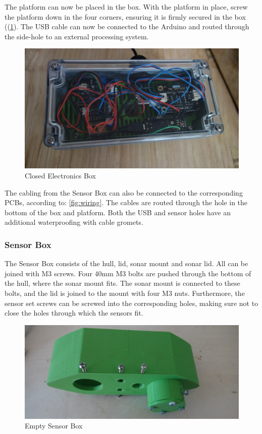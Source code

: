 \documentclass[
  english,
  man,floatsintext]{apa6}
\begin{document}
The platform can now be placed in the box. With the platform in place, screw the platform down in the four corners, ensuring it is firmly secured in the box ((\ref{fig:electro-box}). The USB cable can now be connected to the Arduino and routed through the side-hole to an external processing system.

\begin{figure}[H]
\includegraphics[width=\textwidth,]{sup/electro_box} \caption{Closed Electronics Box}\label{fig:electro-box}
\end{figure}



The cabling from the Sensor Box can also be connected to the corresponding PCBs, according to: \ref{fig:wiring}. The cables are routed through the hole in the bottom of the box and platform. Both the USB and sensor holes have an additional waterproofing with cable gromets.

\hypertarget{sensor-box}{%
\subsubsection{Sensor Box}\label{sensor-box}}

The Sensor Box consists of the hull, lid, sonar mount and sonar lid. All can be joined with M3 screws. Four 40mm M3 bolts are pushed through the bottom of the hull, where the sonar mount fits. The sonar mount is connected to these bolts, and the lid is joined to the mount with four M3 nuts. Furthermore, the sensor set screws can be screwed into the corresponding holes, making sure not to close the holes through which the sensors fit.

\begin{figure}[H]
\includegraphics[width=\textwidth,]{sup/sensor_box_photo} \caption{Empty Sensor Box}\label{fig:sensor-box-photo}
\end{figure}
\end{document}

